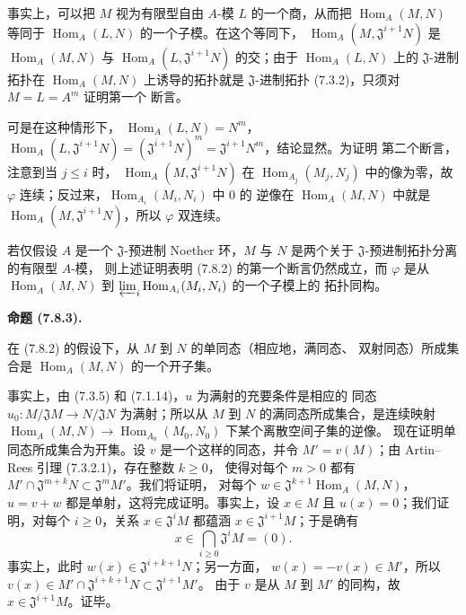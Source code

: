 \documentclass[UTF8,fontset=none,11pt,oneside,openany]{ctexbook}
\newenvironment{proposition}[1][]{%
  \par\medskip\noindent\textbf{命题 (#1).}\ %
}{\par}
\newcommand{\oldpage}[2][]{%
  \hypertarget{ega-source-page-#1-#2}{}%
  \marginnote{\scriptsize\textbf{#1}~|~#2}\ignorespaces}
\let\EGAOriginalLabel\label
\renewcommand{\label}[1]{\phantomsection\EGAOriginalLabel{#1}}
\begin{document}
事实上，可以把 $M$ 视为有限型自由 $A$-模 $L$ 的一个商，从而把
$\operatorname{Hom}_A(M,N)$ 等同于
$\operatorname{Hom}_A(L,N)$ 的一个子模。在这个等同下，
$\operatorname{Hom}_A(M,\mathfrak J^{i+1}N)$ 是
$\operatorname{Hom}_A(M,N)$ 与
$\operatorname{Hom}_A(L,\mathfrak J^{i+1}N)$ 的交；由于
$\operatorname{Hom}_A(L,N)$ 上的 $\mathfrak J$-进制拓扑在
$\operatorname{Hom}_A(M,N)$ 上诱导的拓扑就是
$\mathfrak J$-进制拓扑 (7.3.2)，只须对 $M=L=A^m$ 证明第一个
断言。

\oldpage[0\textsubscript{I}]{78}

可是在这种情形下，
$\operatorname{Hom}_A(L,N)=N^m$，
$\operatorname{Hom}_A(L,\mathfrak J^{i+1}N)=
(\mathfrak J^{i+1}N)^m=\mathfrak J^{i+1}N^m$，结论显然。为证明
第二个断言，注意到当 $j\leq i$ 时，
$\operatorname{Hom}_A(M,\mathfrak J^{i+1}N)$ 在
$\operatorname{Hom}_{A_j}(M_j,N_j)$ 中的像为零，故 $\varphi$
连续；反过来，$\operatorname{Hom}_{A_i}(M_i,N_i)$ 中 $0$ 的
逆像在 $\operatorname{Hom}_A(M,N)$ 中就是
$\operatorname{Hom}_A(M,\mathfrak J^{i+1}N)$，所以 $\varphi$
双连续。

若仅假设 $A$ 是一个 $\mathfrak J$-预进制 Noether 环，$M$ 与
$N$ 是两个关于 $\mathfrak J$-预进制拓扑分离的有限型 $A$-模，
则上述证明表明 (7.8.2) 的第一个断言仍然成立，而 $\varphi$ 是从
$\operatorname{Hom}_A(M,N)$ 到
$\varprojlim_i\operatorname{Hom}_{A_i}(M_i,N_i)$ 的一个子模上的
拓扑同构。

\begin{proposition}[7.8.3]
\label{0.7.8.3-fr}
在 (7.8.2) 的假设下，从 $M$ 到 $N$ 的单同态（相应地，满同态、
双射同态）所成集合是 $\operatorname{Hom}_A(M,N)$ 的一个开子集。
\end{proposition}

事实上，由 (7.3.5) 和 (7.1.14)，$u$ 为满射的充要条件是相应的
同态 $u_0:M/\mathfrak JM\to N/\mathfrak JN$ 为满射；所以从
$M$ 到 $N$ 的满同态所成集合，是连续映射
$\operatorname{Hom}_A(M,N)\to
\operatorname{Hom}_{A_0}(M_0,N_0)$ 下某个离散空间子集的逆像。
现在证明单同态所成集合为开集。设 $v$ 是一个这样的同态，并令
$M'=v(M)$；由 Artin--Rees 引理 (7.3.2.1)，存在整数 $k\geq 0$，
使得对每个 $m>0$ 都有
$M'\cap\mathfrak J^{m+k}N\subset\mathfrak J^mM'$。我们将证明，
对每个 $w\in\mathfrak J^{k+1}\operatorname{Hom}_A(M,N)$，
$u=v+w$ 都是单射，这将完成证明。事实上，设 $x\in M$ 且
$u(x)=0$；我们证明，对每个 $i\geq 0$，关系
$x\in\mathfrak J^iM$ 都蕴涵 $x\in\mathfrak J^{i+1}M$；于是确有
\[
  x\in\bigcap_{i\geq 0}\mathfrak J^iM=(0).
\]
事实上，此时 $w(x)\in\mathfrak J^{i+k+1}N$；另一方面，
$w(x)=-v(x)\in M'$，所以
$v(x)\in M'\cap\mathfrak J^{i+k+1}N\subset\mathfrak J^{i+1}M'$。
由于 $v$ 是从 $M$ 到 $M'$ 的同构，故
$x\in\mathfrak J^{i+1}M$。证毕。
\end{document}
